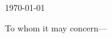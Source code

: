 \documentclass[10pt]{article}
\begin{document}
\bigskip\bigskip\bigskip\bigskip
\bigskip\bigskip\bigskip\bigskip

\today
\bigskip

To whom it may concern---
\bigskip

\lipsum[1-2]
\end{document}
